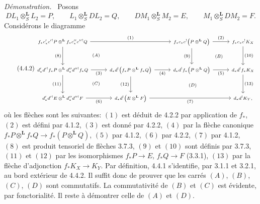 \documentclass[11pt]{article}
\newenvironment{prooftext}[1][Proof]{\par\noindent\emph{#1.}\ }{\par\medskip}
\begin{document}
\begin{prooftext}[Démonstration]
Posons
\[
DL_1\otimes_S^{\mathbf L}L_2=P,\qquad
L_1\otimes_S^{\mathbf L}DL_2=Q,\qquad
DM_1\otimes_S^{\mathbf L}M_2=E,\qquad
M_1\otimes_S^{\mathbf L}DM_2=F.
\]
Considérons le diagramme
\begin{equation}
\tag{4.4.2}
\begin{tikzcd}[column sep=2.6em,row sep=2.6em,cells={nodes={font=\scriptsize}},every label/.append style={font=\scriptsize}]
f_*c'_*c'{}^!P\otimes^{\mathbf L} f_*c''_*c''{}^!Q
  \arrow[rr,"(1)"] \arrow[d,"(8)"'] &&
f_*c_*c^!\bigl(P\otimes^{\mathbf L}Q\bigr)
  \arrow[r,"(2)"] \arrow[d,"(9)"'] &
f_*c_*c^!K_X \arrow[d,"(10)"]\\
d'_*d'{}^!f_*P\otimes^{\mathbf L}d''_*d''{}^!f_*Q
  \arrow[r,"(3)"'] \arrow[d,"(11)"'] &
d_*d^!\bigl(f_*P\otimes^{\mathbf L}f_*Q\bigr)
  \arrow[r,"(4)"'] \arrow[d,"(12)"'] &
d_*d^!f_*\bigl(P\otimes^{\mathbf L}Q\bigr)
  \arrow[r,"(5)"'] &
d_*d^!f_*K_X \arrow[d,"(13)"]\\
d'_*d'{}^!E\otimes^{\mathbf L}d''_*d''{}^!F
  \arrow[r,"(6)"'] &
d_*d^!\bigl(E\otimes^{\mathbf L}F\bigr)
  \arrow[rr,"(7)"'] &&
d_*d^!K_Y,
\arrow[from=1-1,to=2-2, phantom, "\scriptstyle (A)"]
\arrow[from=1-3,to=2-4, phantom, "\scriptstyle (B)"]
\arrow[from=2-1,to=3-2, phantom, "\scriptstyle (C)"]
\arrow[from=2-2,to=3-4, phantom, "\scriptstyle (D)"]
\end{tikzcd}
\end{equation}
où les flèches sont les suivantes: $(1)$ est déduit de 4.2.2 par application de $f_*$, $(2)$ est défini par 4.1.2, $(3)$ est donné par 4.2.2, $(4)$ par la flèche canonique $f_*P\otimes^{\mathbf L}f_*Q\longrightarrow f_*(P\otimes^{\mathbf L}Q)$, $(5)$ par 4.1.2, $(6)$ par 4.2.2, $(7)$ par 4.1.2, $(8)$ est produit tensoriel de flèches 3.7.3, $(9)$ et $(10)$ sont définis par 3.7.3, $(11)$ et $(12)$ par les isomorphismes $f_*P\longrightarrow E$, $f_*Q\longrightarrow F$ (3.3.1), $(13)$ par la flèche d'adjonction $f_*K_X\longrightarrow K_Y$. Par définition, 4.4.1 s'identifie, par 3.1.1 et 3.2.1, au bord extérieur de 4.4.2. Il suffit donc de prouver que les carrés $(A)$, $(B)$, $(C)$, $(D)$ sont commutatifs. La commutativité de $(B)$ et $(C)$ est évidente, par fonctorialité. Il reste à démontrer celle de $(A)$ et $(D)$.


\end{prooftext}
\end{document}
